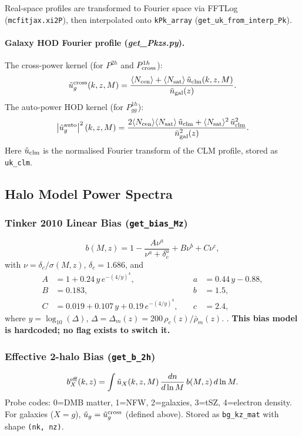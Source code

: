 \documentclass[12pt,a4paper]{article}
\newcommand{\code}[1]{\texttt{\small #1}}
\newcommand{\file}[1]{\textit{\small #1}}
\begin{document}
Real-space profiles are transformed to Fourier space via FFTLog
(\code{mcfitjax.xi2P}), then interpolated onto \code{kPk\_array}
(\code{get\_uk\_from\_interp\_Pk}).

\paragraph{Galaxy HOD Fourier profile (\file{get\_Pkzs.py}).}
The cross-power kernel (for $P^{2h}$ and $P^{1h}_{\rm cross}$):
\begin{equation}
  \tilde u_g^{\rm cross}(k,z,M) =
  \frac{\langle N_{\rm cen}\rangle + \langle N_{\rm sat}\rangle\,\tilde u_{\rm clm}(k,z,M)}
  {\bar n_{\rm gal}(z)}.
\end{equation}
The auto-power HOD kernel (for $P^{1h}_{gg}$):
\begin{equation}
  \left|\tilde u_g^{\rm auto}\right|^2(k,z,M) =
  \frac{2\langle N_{\rm cen}\rangle\langle N_{\rm sat}\rangle\,\tilde u_{\rm clm}
  + \langle N_{\rm sat}\rangle^2\,\tilde u_{\rm clm}^2}{\bar n_{\rm gal}^2(z)}.
\end{equation}
Here $\tilde u_{\rm clm}$ is the normalised Fourier transform of the CLM profile,
stored as \code{uk\_clm}.

\subsection{Halo Model Power Spectra}
\label{sec:Pgg}

\subsubsection{Tinker 2010 Linear Bias (\code{get\_bias\_Mz})}
\begin{equation}
  b(M,z) = 1 - \frac{A\nu^a}{\nu^a+\delta_c^a} + B\nu^b + C\nu^c,
\end{equation}
with $\nu=\delta_c/\sigma(M,z)$, $\delta_c=1.686$, and
\begin{align}
  A &= 1+0.24\,y\,e^{-(4/y)^4}, &\quad a &= 0.44\,y - 0.88, \\
  B &= 0.183, &\quad b &= 1.5, \\
  C &= 0.019+0.107\,y+0.19\,e^{-(4/y)^4}, &\quad c &= 2.4,
\end{align}
where $y=\log_{10}(\Delta)$, $\Delta=\Delta_m(z)=200\,\rho_c(z)/\bar\rho_m(z)$.
\citep{Tinker2010}.
\textbf{This bias model is hardcoded; no flag exists to switch it.}

\subsubsection{Effective 2-halo Bias (\code{get\_b\_2h})}
\begin{equation}
  b_X^{\rm eff}(k,z) = \int \tilde u_X(k,z,M)\,\frac{dn}{d\ln M}\,b(M,z)\,d\ln M.
\end{equation}
Probe codes: 0=DMB matter, 1=NFW, 2=galaxies, 3=tSZ, 4=electron density.
For galaxies ($X=g$), $\tilde u_g = \tilde u_g^{\rm cross}$ (defined above).
Stored as \code{bg\_kz\_mat} with shape \code{(nk, nz)}.
\end{document}
